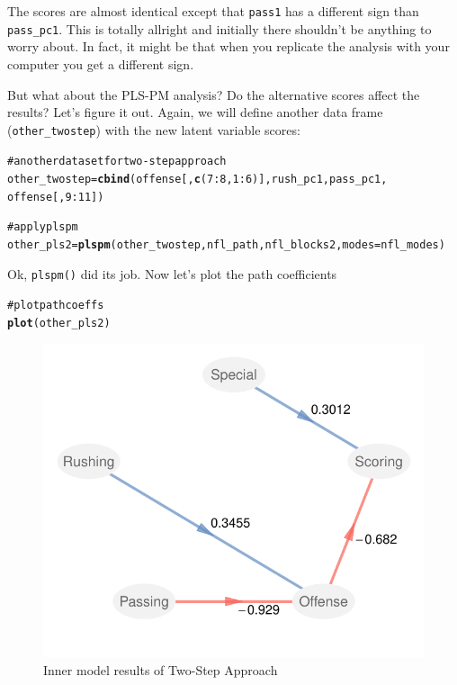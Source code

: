 \documentclass[12pt]{book}\usepackage{graphicx, color}
\makeatletter
\newcommand{\hlfunctioncall}[1]{\textcolor[rgb]{0.501960784313725,0,0.329411764705882}{\textbf{#1}}}%
\newcommand{\hlcomment}[1]{\textcolor[rgb]{0.180392156862745,0.6,0.341176470588235}{#1}}%
\newenvironment{kframe}{%
 \def\at@end@of@kframe{}%
 \ifinner\ifhmode%
  \def\at@end@of@kframe{\end{minipage}}%
  \begin{minipage}{\columnwidth}%
 \fi\fi%
 \def\FrameCommand##1{\hskip\@totalleftmargin \hskip-\fboxsep
 \colorbox{shadecolor}{##1}\hskip-\fboxsep
     \hskip-\linewidth \hskip-\@totalleftmargin \hskip\columnwidth}%
 \MakeFramed {\advance\hsize-\width
   \@totalleftmargin\z@ \linewidth\hsize
   \@setminipage}}%
 {\par\unskip\endMakeFramed%
 \at@end@of@kframe}
\newenvironment{knitrout}{}{} %
\newcommand{\fplspm}{\texttt{plspm()}}
\newcommand{\code}[1]{\texttt{#1}}
\makeatother
\begin{document}
The scores are almost identical except that \code{pass1} has a different sign than \code{pass\_pc1}.  This is totally allright and initially there shouldn't be anything to worry about. In fact, it might be that when you replicate the analysis with your computer you get a different sign.

But what about the PLS-PM analysis? Do the alternative scores affect the results? Let's figure it out. Again, we will define another data frame (\code{other\_twostep}) with the new latent variable scores:
\begin{knitrout}
\color{fgcolor}\begin{kframe}
\begin{alltt}
\hlcomment{# another dataset for two-step approach}
other_twostep = \hlfunctioncall{cbind}(offense[,\hlfunctioncall{c}(7:8, 1:6)], rush_pc1, pass_pc1, 
                      offense[,9:11])

\hlcomment{# apply plspm}
other_pls2 = \hlfunctioncall{plspm}(other_twostep, nfl_path, nfl_blocks2, modes = nfl_modes)
\end{alltt}
\end{kframe}
\end{knitrout}


Ok, \fplspm{} did its job. Now let's plot the path coefficients
\begin{knitrout}
\color{fgcolor}\begin{kframe}
\begin{alltt}
\hlcomment{# plot path coeffs}
\hlfunctioncall{plot}(other_pls2)
\end{alltt}
\end{kframe}\begin{figure}[h]


{\centering \includegraphics[width=.75\linewidth,height=.45\linewidth]{figure/another_patchy_path_coeff} 

}

\caption[Inner model results of Two-Step Approach]{Inner model results of Two-Step Approach\label{fig:another_patchy_path_coeff}}
\end{figure}


\end{knitrout}
\end{document}
